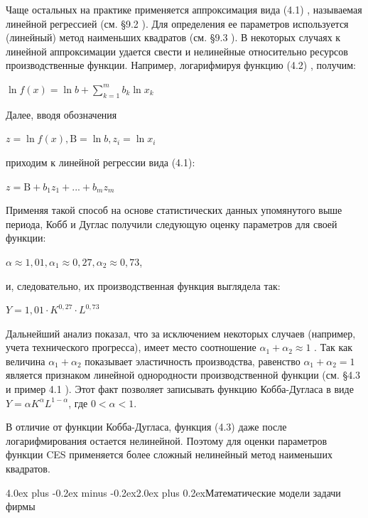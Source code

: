 \documentclass[12pt, 4paper]{book}
\makeatletter
\renewcommand{\section}{\@startsection{section}{1}{1pt}%
	{4.0ex plus -0.2ex minus -0.2ex}{2.0ex plus 0.2ex}{\centering\bf}}%
\makeatother
\begin{document}
{Чаще остальных на практике применяется аппроксимация вида (4.1) , называемая линейной регрессией (см. §9.2 ). Для определения ее параметров используется (линейный) метод наименьших квадратов (см. §9.3 ). В некоторых случаях к линейной аппроксимации удается свести и нелинейные относительно ресурсов производственные функции. Например, логарифмируя функцию (4.2) , получим: 
\begin{center}
$\ln f(x) = \ln b + \sum\limits_{k=1}^{m}b_k \ln x_k$
\end{center}
\par

Далее, вводя обозначения 
\begin{center}
$z = \ln f(x),\text{B} = \ln b , z_i = \ln x_i$
\end{center}
приходим к линейной регрессии вида (4.1):
\begin{center}
$z = \text{B}+ b_1 z_1 + ... + b_m z_m$
\end{center}
\par

Применяя такой способ на основе статистических данных упомянутого выше периода, Кобб и Дуглас получили следующую оценку параметров для своей функции: 
\begin{center}
$\alpha \approx 1,01, \alpha_1 \approx 0,27, \alpha_2 \approx 0,73$,
\end{center}
и, следовательно, их производственная функция выглядела так: 
\begin{center}
$Y=1,01 \cdot K^{0,27} \cdot L^{0,73}$
\end{center}
\par

Дальнейший анализ показал, что за исключением некоторых случаев (например, учета технического прогресса), имеет место соотношение $\alpha_1 + \alpha_2 \approx 1$ . Так как величина $\alpha_1 + \alpha_2$ показывает эластичность производства, равенство $\alpha_1 + \alpha_2=1$ является признаком линейной однородности производственной функции (см. §4.3 и пример 4.1 ). Этот факт позволяет записывать функцию Кобба-Дугласа в виде $Y = \alpha K^{\alpha}L^{1-\alpha}$, где $0 < \alpha < 1$. 
\par

В отличие от функции Кобба-Дугласа, функция (4.3) даже после логарифмирования остается нелинейной. Поэтому для оценки параметров функции CES применяется более сложный нелинейный метод наименьших квадратов. 
\newpage
\begin{center}
\section{Математические модели задачи фирмы}
\end{center}
\par

}
\end{document}
